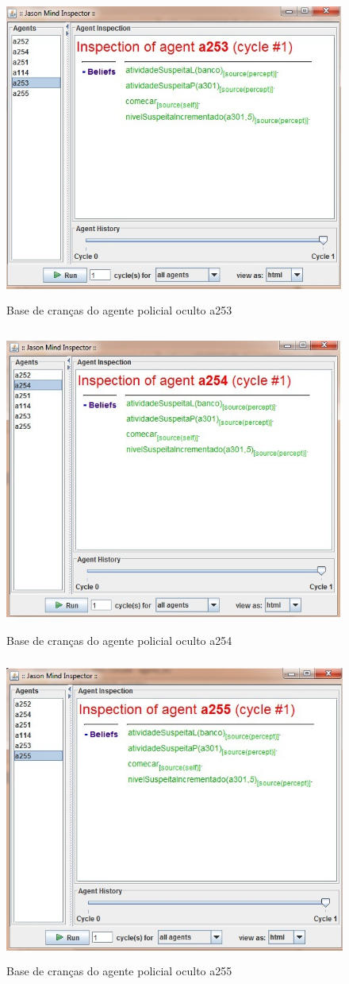 \begin{figure}
\centering
\includegraphics [height=10cm]{figuras/crencas_policial253.jpg}
\caption{Base de cranças do agente policial oculto a253}
\label{baseA253}
\end{figure}
\begin{figure}
\centering
\includegraphics [height=10cm]{figuras/crencas_policial254.jpg}
\caption{Base de cranças do agente policial oculto a254}
\label{baseA254}
\end{figure}
\begin{figure}
\centering
\includegraphics [height=10cm]{figuras/crencas_policial255.jpg}
\caption{Base de cranças do agente policial oculto a255}
\label{baseA255}
\end{figure}

